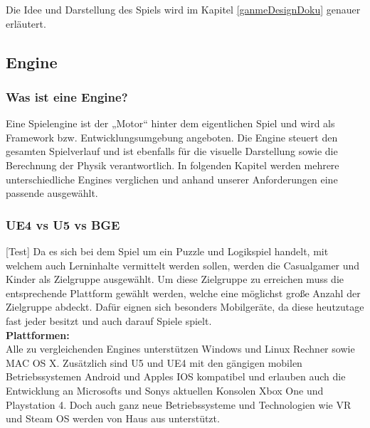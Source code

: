 

Die Idee und Darstellung des Spiels wird im Kapitel \ref{ganmeDesignDoku} genauer erläutert.

\subsection{Engine}
\subsubsection{Was ist eine Engine?}
Eine Spielengine ist der „Motor“ hinter dem eigentlichen Spiel und wird als Framework bzw. Entwicklungsumgebung angeboten. Die Engine steuert den gesamten Spielverlauf und ist ebenfalls für die visuelle Darstellung sowie die Berechnung der Physik verantwortlich. In folgenden Kapitel werden mehrere unterschiedliche Engines verglichen und anhand unserer Anforderungen eine passende ausgewählt. 

\subsubsection{\ac{UE4} vs \ac{U5} vs \ac{BGE}}[Test]
Da es sich bei dem Spiel um ein Puzzle und Logikspiel handelt, mit welchem auch Lerninhalte vermittelt werden sollen, werden die Casualgamer und Kinder als Zielgruppe ausgewählt. Um diese Zielgruppe zu erreichen muss die entsprechende Plattform gewählt werden, welche eine möglichst große Anzahl der Zielgruppe abdeckt. Dafür eignen sich besonders Mobilgeräte, da diese heutzutage fast jeder besitzt und auch darauf Spiele spielt.  \\

\textbf{Plattformen:}\\
Alle zu vergleichenden Engines unterstützen Windows und Linux Rechner sowie MAC OS X. Zusätzlich sind \ac{U5} und \ac{UE4} mit den gängigen mobilen Betriebssystemen Android und Apples IOS kompatibel und erlauben auch die Entwicklung an Microsofts und Sonys aktuellen Konsolen Xbox One und Playstation 4. Doch auch ganz neue Betriebssysteme und Technologien wie VR und Steam OS werden von Haus aus unterstützt.

